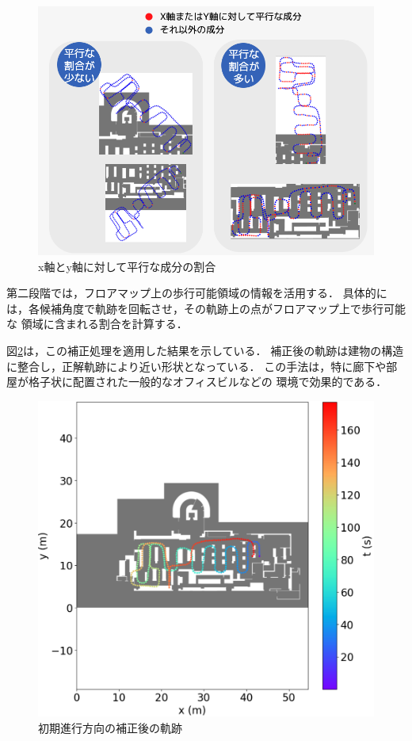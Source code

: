 \begin{figure}[H]
	\centering
	\includegraphics[width=\linewidth]{../image/parallel.jpg}
	\caption{x軸とy軸に対して平行な成分の割合}    \label{fig:parallel}
\end{figure}

第二段階では，フロアマップ上の歩行可能領域の情報を活用する．
具体的には，各候補角度で軌跡を回転させ，その軌跡上の点がフロアマップ上で歩行可能な
領域に含まれる割合を計算する．

図\ref{fig:pdr-rotate}は，この補正処理を適用した結果を示している．
補正後の軌跡は建物の構造に整合し，正解軌跡により近い形状となっている．
この手法は，特に廊下や部屋が格子状に配置された一般的なオフィスビルなどの
環境で効果的である．

\begin{figure}[H]
	\centering
	\includegraphics[width=\linewidth]{../image/pdr-rotate.jpg}
	\caption{初期進行方向の補正後の軌跡}    \label{fig:pdr-rotate}
\end{figure}



